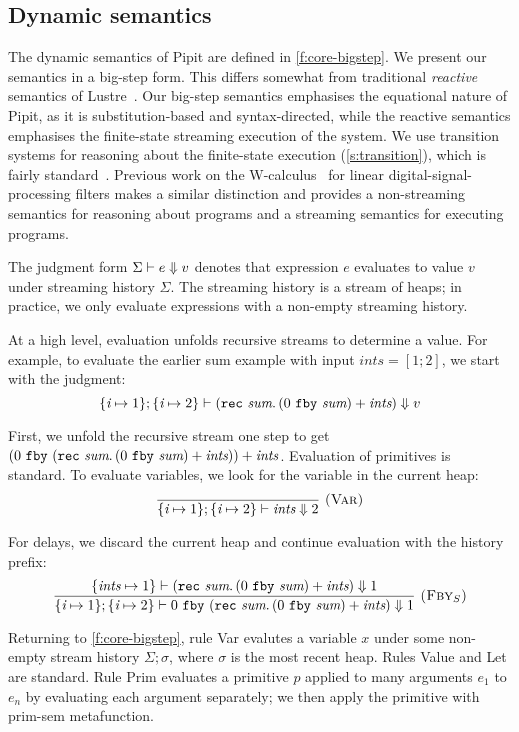 \subsection{Dynamic semantics}
\label{s:core:dynamic}


The dynamic semantics of Pipit are defined in \autoref{f:core-bigstep}.
We present our semantics in a big-step form.
This differs somewhat from traditional \emph{reactive} semantics of Lustre~\cite{caspi1995functional}.
Our big-step semantics emphasises the equational nature of Pipit, as it is substitution-based and syntax-directed, while the reactive semantics emphasises the finite-state streaming execution of the system.
We use transition systems for reasoning about the finite-state execution (\autoref{s:transition}), which is fairly standard~\cite{brun2023equation,champion2016kind2,raymond2008synchronous}.
Previous work on the {\sc W-calculus}~\cite{gallego2021w} for linear digital-signal-processing filters makes a similar distinction and provides a non-streaming semantics for reasoning about programs and a streaming semantics for executing programs.


The judgment form $\Sigma \vdash e \Downarrow v$ denotes that expression $e$ evaluates to value $v$ under streaming history $\Sigma$.
The streaming history is a stream of heaps; in practice, we only evaluate expressions with a non-empty streaming history.

At a high level, evaluation unfolds recursive streams to determine a value.
For example, to evaluate the earlier sum example with input $\textit{ints} = [1; 2]$, we start with the judgment:
$$
\{ \textit{i} \mapsto 1 \}; \{ \textit{i} \mapsto 2 \} \vdash (\texttt{rec}~\textit{sum}.\, (0~\texttt{fby}~\textit{sum}) + \textit{ints}) \Downarrow v
$$

First, we unfold the recursive stream one step to get $(0~\texttt{fby}~(\texttt{rec}~\textit{sum}.\, (0~\texttt{fby}~\textit{sum}) + \textit{ints})) + \textit{ints}$.
Evaluation of primitives is standard.
To evaluate variables, we look for the variable in the current heap:
$$
\enskip \frac {\displaystyle 
} {\displaystyle 
  \{ \textit{i} \mapsto 1 \}; \{ \textit{i} \mapsto 2 \} \vdash \textit{ints} \Downarrow 2
} \  \textsc{(Var)} \enskip
$$

For delays, we discard the current heap and continue evaluation with the history prefix:
$$
\enskip \frac {\displaystyle 
  \{ \textit{ints} \mapsto 1 \} \vdash (\texttt{rec}~\textit{sum}.\, (0~\texttt{fby}~\textit{sum}) + \textit{ints}) \Downarrow 1
} {\displaystyle 
  \{ \textit{i} \mapsto 1 \}; \{ \textit{i} \mapsto 2 \} \vdash 0~\texttt{fby}~(\texttt{rec}~\textit{sum}.\, (0~\texttt{fby}~\textit{sum}) + \textit{ints}) \Downarrow 1
} \  \textsc{($\mbox{Fby}_S$)} \enskip
$$

Returning to \autoref{f:core-bigstep},
rule {\sc Var} evalutes a variable $x$ under some non-empty stream history $\Sigma; \sigma$, where $\sigma$ is the most recent heap.
Rules {\sc Value} and {\sc Let} are standard.
Rule {\sc Prim} evaluates a primitive $p$ applied to many arguments $e_1$ to $e_n$ by evaluating each argument separately; we then apply the primitive with prim-sem metafunction.

